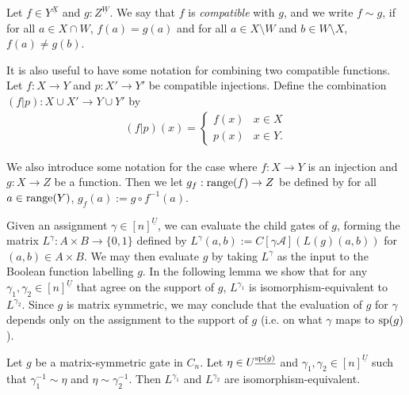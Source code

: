 \documentclass[../paper.tex]{subfiles}
\begin{document}
\begin{definition}
  Let $f \in Y^{\underline{X}}$ and $g : Z^{\underline{W}}$. We say that $f$ is
  \emph{compatible} with $g$, and we write $f \sim g$, if for all $a \in X \cap
  W$, $f(a) = g(a)$ and for all $a \in X \setminus W$ and $b \in W \setminus X$,
  $f(a) \neq g(b)$.
\end{definition}

It is also useful to have some notation for combining two compatible functions.
Let $f : X \rightarrow Y$ and $p: X' \rightarrow Y'$ be compatible injections.
Define the combination $(f | p): X \cup X' \rightarrow Y \cup Y'$ by
\begin{align*}
  (f \vert p) (x) =
  \begin{cases}
    f (x) & x \in X \\
    p (x) & x \in Y.
  \end{cases}
\end{align*}

We also introduce some notation for the case where $f: X \rightarrow Y$ is an
injection and $g: X \rightarrow Z$ be a function. Then we let $g_f : \text{range}(f)
\rightarrow Z$ be defined by for all $a \in \text{range}(Y)$, $g_f(a) := g \circ
f^{-1}(a)$.

Given an assignment $\gamma \in [n]^{\underline{U}}$, we can evaluate the child
gates of $g$, forming the matrix $L^{\gamma} : A \times B \rightarrow \{0,1\}$
defined by $L^{\gamma} (a,b) := C[\gamma \mathcal{A}](L(g)(a,b))$ for $(a,b) \in
A \times B$. We may then evaluate $g$ by taking $L^{\gamma}$ as the input to the
Boolean function labelling $g$. In the following lemma we show that for any
$\gamma_1, \gamma_2 \in [n]^{\underline{U}}$ that agree on the support of $g$,
$L^{\gamma_1}$ is isomorphism-equivalent to $L^{\gamma_2}$. Since $g$ is matrix
symmetric, we may conclude that the evaluation of $g$ for $\gamma$ depends only
on the assignment to the support of $g$ (i.e. on what $\gamma$ maps to
$\text{sp}(g)$).

\begin{lem}
  Let $g$ be a matrix-symmetric gate in $C_n$. Let $\eta \in
  U^{\underline{\text{sp}(g)}}$ and $\gamma_1, \gamma_2 \in [n]^{\underline{U}}$
  such that $\gamma^{-1}_1 \sim \eta$ and $\eta \sim \gamma^{-1}_2$. Then
  $L^{\gamma_1}$ and $L^{\gamma_2}$ are isomorphism-equivalent.
  \label{lem:support-determines-evaluation}
\end{lem}
\end{document}
